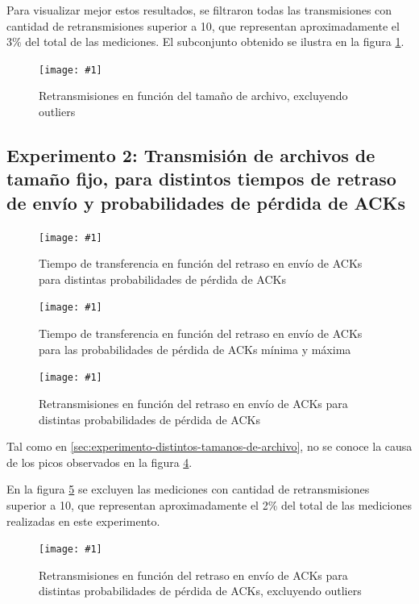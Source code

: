 \documentclass[a4paper, 10pt, twoside]{article}
\newcommand{\grafico}[3]{
  \begin{figure}[H]
    \texttt{[image: \#1]}
    \caption{#2}
    \label{#3}
  \end{figure}
}
\begin{document}
Para visualizar mejor estos resultados, se filtraron todas las transmisiones con cantidad de retransmisiones superior a 10, que representan aproximadamente el 3\% del total de las mediciones. El subconjunto obtenido se ilustra en la figura \ref{plot:retransmissions_vs_size_wo_outliers}.

\grafico{retransmissions_vs_size_wo_outliers}
        {Retransmisiones en función del tamaño de archivo, excluyendo outliers}
        {plot:retransmissions_vs_size_wo_outliers}


\subsection{Experimento 2: Transmisión de archivos de tamaño fijo, para distintos tiempos de retraso de envío y probabilidades de pérdida de ACKs}

\grafico{time_vs_delay_and_loss_probability}
        {Tiempo de transferencia en función del retraso en envío de ACKs para distintas probabilidades de pérdida de ACKs}
        {plot:time_vs_delay_and_loss_probability}

\grafico{time_vs_delay_and_loss_probability_min_max}
        {Tiempo de transferencia en función del retraso en envío de ACKs para las probabilidades de pérdida de ACKs mínima y máxima}
        {plot:time_vs_delay_and_loss_probability_min_max}

\grafico{retransmissions_vs_delay_and_loss_probability}
        {Retransmisiones en función del retraso en envío de ACKs para distintas probabilidades de pérdida de ACKs}
        {plot:retransmissions_vs_delay_and_loss_probability}

Tal como en \ref{sec:experimento-distintos-tamanos-de-archivo}, no se conoce la causa de los picos observados en la figura \ref{plot:retransmissions_vs_delay_and_loss_probability}.

En la figura \ref{plot:retransmissions_vs_delay_and_loss_probability_wo_outliers} se excluyen las mediciones con cantidad de retransmisiones superior a 10, que representan aproximadamente el 2\% del total de las mediciones realizadas en este experimento.

\grafico{retransmissions_vs_delay_and_loss_probability_wo_outliers}
        {Retransmisiones en función del retraso en envío de ACKs para distintas probabilidades de pérdida de ACKs, excluyendo outliers}
        {plot:retransmissions_vs_delay_and_loss_probability_wo_outliers}


\end{document}
